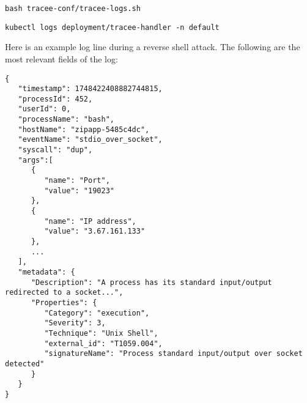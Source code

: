 \texttt{bash tracee-conf/tracee-logs.sh}

\texttt{kubectl logs deployment/tracee-handler -n default}

\noindent Here is an example log line during a reverse shell attack. The following are the most relevant fields of the log:
\begin{verbatim}
{
   "timestamp": 1748422408882744815,
   "processId": 452,
   "userId": 0,
   "processName": "bash",
   "hostName": "zipapp-5485c4dc",
   "eventName": "stdio_over_socket",
   "syscall": "dup",
   "args":[
      {
         "name": "Port",
         "value": "19023"
      },
      {
         "name": "IP address",
         "value": "3.67.161.133"
      },
      ...
   ],
   "metadata": {
      "Description": "A process has its standard input/output redirected to a socket...",
      "Properties": {
         "Category": "execution",
         "Severity": 3,
         "Technique": "Unix Shell",
         "external_id": "T1059.004",
         "signatureName": "Process standard input/output over socket detected"
      }
   }
}
\end{verbatim}

